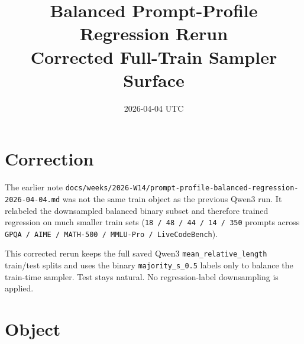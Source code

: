 \documentclass[11pt]{article}
\title{Balanced Prompt-Profile Regression Rerun\\Corrected Full-Train Sampler Surface}
\author{}
\date{2026-04-04 UTC}
\begin{document}
\maketitle

\section{Correction}

The earlier note \texttt{docs/weeks/2026-W14/prompt-profile-balanced-regression-2026-04-04.md}
was not the same train object as the previous Qwen3 run. It relabeled the
downsampled balanced binary subset and therefore trained regression on much
smaller train sets (\texttt{18 / 48 / 44 / 14 / 350} prompts across
\texttt{GPQA / AIME / MATH-500 / MMLU-Pro / LiveCodeBench}).

This corrected rerun keeps the full saved Qwen3 \texttt{mean\_relative\_length}
train/test splits and uses the binary \texttt{majority\_s\_0.5} labels only to
balance the train-time sampler. Test stays natural. No regression-label
downsampling is applied.

\section{Object}
\end{document}
